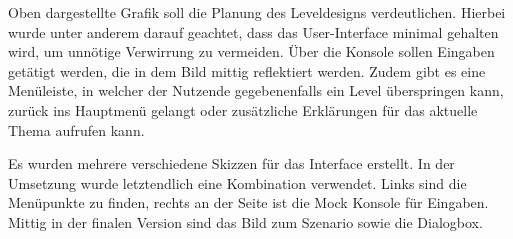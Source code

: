 Oben dargestellte Grafik soll die Planung des Leveldesigns verdeutlichen. Hierbei wurde unter anderem darauf geachtet, dass das User-Interface minimal gehalten wird, um unnötige Verwirrung zu vermeiden.
Über die Konsole sollen Eingaben getätigt werden, die in dem Bild mittig reflektiert werden. Zudem gibt es eine Menüleiste, in welcher der Nutzende gegebenenfalls ein Level überspringen kann, zurück ins Hauptmenü gelangt oder zusätzliche Erklärungen für das aktuelle Thema aufrufen kann.

Es wurden mehrere verschiedene Skizzen für das Interface erstellt. In der Umsetzung wurde letztendlich eine Kombination verwendet. Links sind die Menüpunkte zu finden, rechts an der Seite ist die Mock Konsole für Eingaben. Mittig in der finalen Version sind das Bild zum Szenario sowie die Dialogbox.